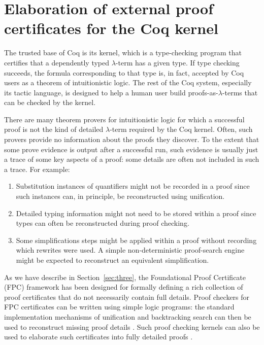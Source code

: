 \section{Elaboration of external proof certificates for the Coq
  kernel}


The trusted base of Coq is its kernel, which is a type-checking
program that certifies that a dependently typed $\lambda$-term has a
given type.  If type checking succeeds, the formula corresponding to
that type is, in fact, accepted by Coq users as a theorem of
intuitionistic logic.  The rest of the Coq system, especially its
tactic language, is designed to help a human user build
proofs-as-$\lambda$-terms that can be checked by the kernel.

There are many theorem provers for intuitionistic logic
\cite{raths07jar} for which a successful proof is not the kind of
detailed $\lambda$-term required by the Coq kernel.  Often, such
provers provide no information about the proofs they discover.  To the
extent that some prove evidence is output after a successful run, such
evidence is usually just a trace of some key aspects of a proof: some
details are often not included in such a trace.  For example:
\begin{enumerate}

\item Substitution instances of quantifiers might not be recorded in a
  proof since such instances can, in principle, be reconstructed using
  unification.

\item Detailed typing information might not need to be stored within a
  proof since types can often be reconstructed during proof checking.

\item Some simplifications steps might be applied within a proof
  without recording which rewrites were used.  A simple 
  non-deterministic proof-search engine might be expected to
  reconstruct an equivalent simplification.
\end{enumerate}

As we have describe in Section~\ref{sec:three}, the Foundational Proof
Certificate (FPC) framework has been designed for formally defining a
rich collection of proof certificates that do not necessarily contain
full details.  Proof checkers for FPC certificates can be written
using simple logic programs: the standard implementation mechanisms of
unification and backtracking search can then be used to reconstruct
missing proof details \cite{miller17fac}.  Such proof checking kernels
can also be used to elaborate such certificates into fully detailed
proofs \cite{blanco17phd,blanco17cade}.

